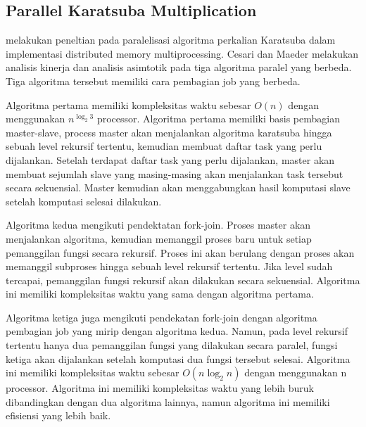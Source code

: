   \subsection{Parallel Karatsuba Multiplication} \label{sec:parallel_karatsuba}
    \citep{parallel_karatsuba_analysis} melakukan peneltian pada paralelisasi algoritma perkalian Karatsuba dalam implementasi distributed memory multiprocessing. Cesari dan Maeder melakukan analisis  kinerja dan analisis asimtotik pada tiga algoritma paralel yang berbeda. Tiga algoritma tersebut memiliki cara pembagian job yang berbeda.

    Algoritma pertama memiliki kompleksitas waktu sebesar $O(n)$ dengan menggunakan $n^{\log_2 3}$ processor. Algoritma pertama memiliki basis pembagian master-slave, process master akan menjalankan algoritma karatsuba hingga sebuah level rekursif tertentu, kemudian membuat daftar task yang perlu dijalankan. Setelah terdapat daftar task yang perlu dijalankan, master akan membuat sejumlah slave yang masing-masing akan menjalankan task tersebut secara sekuensial. Master kemudian akan menggabungkan hasil komputasi slave setelah komputasi selesai dilakukan.

    Algoritma kedua mengikuti pendektatan fork-join. Proses master akan menjalankan algoritma, kemudian memanggil proses baru untuk setiap pemanggilan fungsi secara rekursif. Proses ini akan berulang dengan proses akan memanggil subproses hingga sebuah level rekursif tertentu. Jika level sudah tercapai, pemanggilan fungsi rekursif akan dilakukan secara sekuensial. Algoritma ini memiliki kompleksitas waktu yang sama dengan algoritma pertama.

    Algoritma ketiga juga mengikuti pendekatan fork-join dengan algoritma pembagian job yang mirip dengan algoritma kedua. Namun, pada level rekursif tertentu hanya dua pemanggilan fungsi yang dilakukan secara paralel, fungsi ketiga akan dijalankan setelah komputasi dua fungsi tersebut selesai. Algoritma ini memiliki kompleksitas waktu sebesar $O(n\log_2n)$ dengan menggunakan n processor. Algoritma ini memiliki kompleksitas waktu yang lebih buruk dibandingkan dengan dua algoritma lainnya, namun algoritma ini memiliki efisiensi yang lebih baik.




